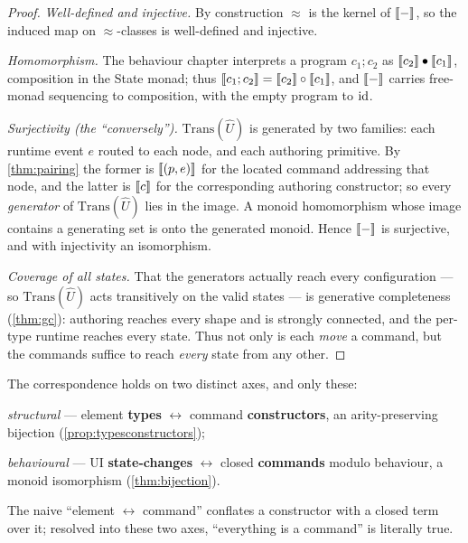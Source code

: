 \documentclass[../uxoxo-main]{subfiles}
\begin{document}
\begin{proof}
\emph{Well-defined and injective.} By construction $\approx$ is the kernel of
$\llbracket - \rrbracket$, so the induced map on $\approx$-classes is well-defined and injective.

\emph{Homomorphism.} The behaviour chapter interprets a program $c_1;c_2$ as
$\llbracket c_2 \rrbracket\bullet\llbracket c_1 \rrbracket$, composition in the State monad; thus
$\llbracket c_1;c_2 \rrbracket=\llbracket c_2 \rrbracket\circ\llbracket c_1 \rrbracket$, and $\llbracket - \rrbracket$ carries free-monad
sequencing to composition, with the empty program to $\mathrm{id}$.

\emph{Surjectivity (the ``conversely'').} $\mathrm{Trans}(\widehat U)$ is generated
by two families: each runtime event $e$ routed to each node, and each authoring
primitive. By \cref{thm:pairing} the former is $\llbracket (p,e) \rrbracket$ for the located
command addressing that node, and the latter is $\llbracket c \rrbracket$ for the corresponding
authoring constructor; so every \emph{generator} of $\mathrm{Trans}(\widehat U)$
lies in the image. A monoid homomorphism whose image contains a generating set is
onto the generated monoid. Hence $\llbracket - \rrbracket$ is surjective, and with injectivity an
isomorphism.

\emph{Coverage of all states.} That the generators actually reach every
configuration --- so $\mathrm{Trans}(\widehat U)$ acts transitively on the valid
states --- is generative completeness (\cref{thm:gc}): authoring reaches every
shape and is strongly connected, and the per-type runtime reaches every state.
Thus not only is each \emph{move} a command, but the commands suffice to reach
\emph{every} state from any other.
\end{proof}

\begin{corollary}\label{cor:readings}
The correspondence holds on two distinct axes, and only these:
\begin{definitionlist}
  \item \emph{structural} --- element \textbf{types} $\leftrightarrow$ command
        \textbf{constructors}, an arity-preserving bijection (\cref{prop:typesconstructors});
  \item \emph{behavioural} --- UI \textbf{state-changes} $\leftrightarrow$ closed
        \textbf{commands} modulo behaviour, a monoid isomorphism (\cref{thm:bijection}).
\end{definitionlist}
The naive ``element $\leftrightarrow$ command'' conflates a constructor with a
closed term over it; resolved into these two axes, ``everything is a command'' is
literally true.
\end{corollary}
\end{document}
